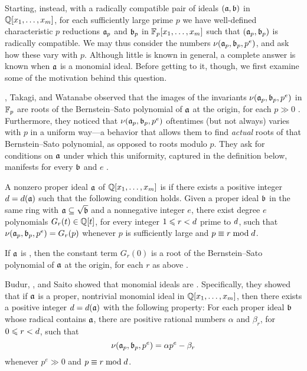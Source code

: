 \documentclass{amsart}
\begin{document}
Starting, instead, with a radically compatible pair of ideals $(\mathfrak{a},\mathfrak{b})$ in $\mathbb{Q}[x_1,\ldots,x_m]$, for each sufficiently large prime $p$ we have well-defined characteristic $p$ reductions $\mathfrak{a}_p$ and $\mathfrak{b}_p$ in $\mathbb{F}_p[x_1,\ldots,x_m]$ such that $(\mathfrak{a}_p,\mathfrak{b}_p)$ is radically compatible.
We may thus consider the numbers $\nu(\mathfrak{a}_p,\mathfrak{b}_p,p^e)$, and ask how these vary with $p$.
Although little is known in general, a complete answer is known when $\mathfrak{a}$ is a monomial ideal.
Before getting to it, though, we first examine some of the motivation behind this question.

\mustata, Takagi, and Watanabe observed that the images of the invariants $\nu(\mathfrak{a}_p,\mathfrak{b}_p,p^e)$ in $\mathbb{F}_p$ are roots of the Bernstein--Sato polynomial of $\mathfrak{a}$ at the origin, for each $p \gg 0$ \cite[Proposition~3.11]{mustata+takagi+watanabe.F-thresholds}.
Furthermore, they noticed that $\nu(\mathfrak{a}_p,\mathfrak{b}_p,p^e)$ oftentimes (but not always) varies with $p$ in a uniform way---a behavior that allows them to find \emph{actual} roots of that Bernstein--Sato polynomial, as opposed to roots modulo $p$.
They ask for conditions on $\mathfrak{a}$ under which this uniformity, captured in the definition below, manifests for every $\mathfrak{b}$ and $e$ \cite[Problem~3.8]{mustata+takagi+watanabe.F-thresholds}.

\begin{definition}
   \label{defn: nuCool}
   A nonzero proper ideal $\mathfrak{a}$ of $\mathbb{Q}[x_1,\ldots,x_m]$ is \emph{\nuCool} if there exists a positive integer $d = d(\mathfrak{a})$ such that the following condition holds.
   Given a proper ideal $\mathfrak{b}$ in the same ring with $\mathfrak{a} \subseteq \sqrt {\mathfrak{b}}$ and a nonnegative integer $e$, there exist degree $e$ polynomials $G_r(t) \in \mathbb{Q}[t]$, for every integer $1 \leqslant r < d$ prime to $d$, such that $\nu(\mathfrak{a}_p, \mathfrak{b}_p, p^e) = G_r(p)$ whenever $p$ is sufficiently large and $p \equiv r \bmod d$.
\end{definition}

If $\mathfrak{a}$ is \nuCool, then the constant term $G_r(0)$ is a root of the Bernstein--Sato polynomial of $\mathfrak{a}$ at the origin, for each $r$ as above \cite[Remark~3.13]{mustata+takagi+watanabe.F-thresholds}.

\smallskip

Budur, \mustata, and Saito showed that monomial ideals are \nuCool \cite[Theorem~4.1]{budur+mustata+saito.roots_bs_polys_monomial}.
Specifically, they showed that if $\mathfrak{a}$ is a proper, nontrivial monomial ideal in $\mathbb{Q}[x_1,\ldots,x_m]$, then there exists a positive integer $d = d(\mathfrak{a})$ with the following property:
For each proper ideal $\mathfrak{b}$ whose radical contains $\mathfrak{a}$, there are positive rational numbers $\alpha$ and $\beta_r$, for $0 \leqslant r < d$, such that
\begin{equation}
   \label{eq: nu-uniformity for monomial ideals}
   \nu(\mathfrak{a}_p, \mathfrak{b}_p, p^e) = \alpha p^e - \beta_r
\end{equation}
whenever $p^e \gg 0$ and $p \equiv r \bmod d$.
\end{document}
